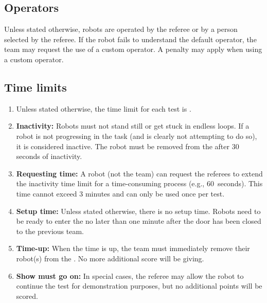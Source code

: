 \subsection{Operators}\label{rule:operator}
Unless stated otherwise, robots are operated by the referee or by a person selected by the referee.
If the robot fails to understand the default operator, the team may request the use of a custom operator.
A penalty may apply when using a custom operator.


\subsection{Time limits}\label{rule:time_limits}
\begin{enumerate}
	\item Unless stated otherwise, the time limit for each test is .

	\item \textbf{Inactivity:} Robots must not stand still or get stuck in endless loops.
	If a robot is not progressing in the task (and is clearly not attempting to do so), it is considered inactive.
	The robot must be removed from the \Arena{} after 30 seconds of inactivity.

	\item \textbf{Requesting time:} A robot (not the team) can request the referees to extend the inactivity time limit for a time-consuming process (e.g., 60~seconds). This time cannot exceed 3 minutes and can only be used once per test.

	\item \textbf{Setup time:} Unless stated otherwise, there is no setup time.
	Robots need to be ready to enter the \Arena{} no later than one minute after the door has been closed to the previous team.

	\item \textbf{Time-up:} When the time is up, the team must immediately remove their robot(s) from the  \Arena{}.
	No more additional score will be giving.

	\item \textbf{Show must go on:} In special cases, the referee may allow the robot to continue the test for demonstration purposes, but no additional points will be scored.
\end{enumerate}
